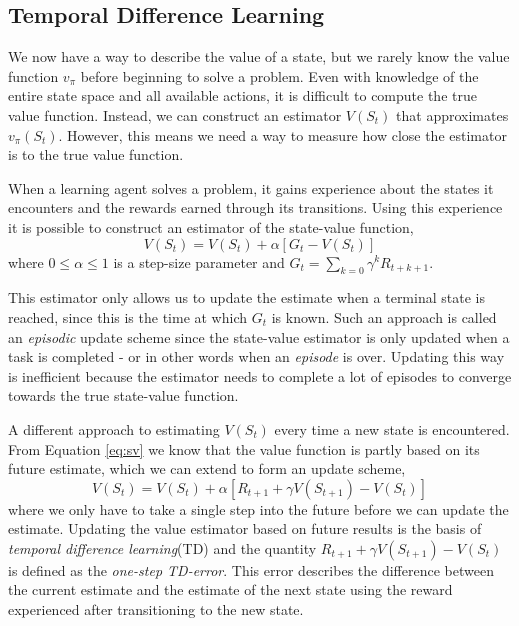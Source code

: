 \documentclass[11pt]{article}
\begin{document}
\maketitle

\subsection{Temporal Difference Learning}\label{sec:td}

We now have a way to describe the value of a state, but we rarely know the
value function $v_\pi$ before beginning to solve a problem.
Even with knowledge of the entire state space and all available actions,
it is difficult to compute the true value function.
Instead, we can construct an estimator $V(S_t)$ that
approximates $v_\pi(S_t)$. However, this means we need a way
to measure how close the estimator is to the true value function.

When a learning agent solves a problem, it gains experience
about the states it encounters and the rewards earned through its transitions.
Using this experience it is possible to construct an estimator 
of the state-value function,
\begin{equation}
    V(S_t) = V(S_t) + \alpha [G_t - V(S_t)]
\end{equation}
where $0 \leq \alpha \leq 1$ is a step-size parameter and
$G_t = \sum\limits_{k=0} \gamma^k R_{t+k+1}$.

This estimator only allows us to update the estimate when a
terminal state is reached, since this is the time at which $G_t$ is known.
Such an approach is called an \textit{episodic} update scheme since the
state-value estimator is only updated when a task is completed -
or in other words when an \textit{episode} is over.
Updating this way is inefficient because the estimator needs to complete
a lot of episodes to converge towards the true state-value function.

A different approach to estimating $V(S_t)$ every time a new state is encountered.
From Equation \ref{eq:sv} we know that the value function is partly based on its future
estimate, which we can extend to form an update scheme,
\begin{equation}\label{eq:up}
    V(S_t) = V(S_t) + \alpha  [R_{t+1} + \gamma  V(S_{t+1}) - V(S_t)]
\end{equation}
where we only have to take a single step into the future before we can 
update the estimate.
Updating the value estimator based on future results is the basis
of \textit{temporal difference learning}(TD) and the quantity $R_{t+1} + \gamma  V(S_{t+1}) - V(S_t)$
is defined as the \textit{one-step TD-error}.
This error describes the difference between the current estimate
and the estimate of the next state using the reward experienced after
transitioning to the new state.
\end{document}
